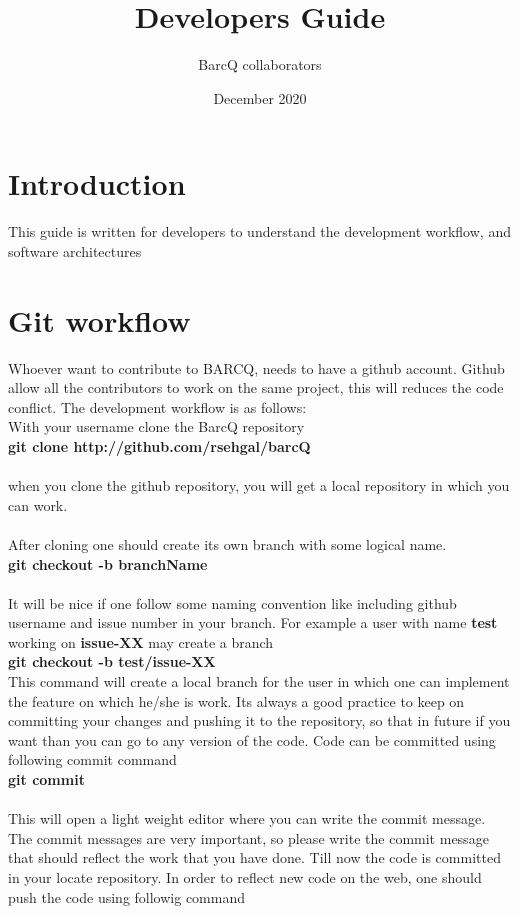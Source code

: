 \documentclass{article}
\title{Developers Guide}
\author{BarcQ collaborators }
\date{December 2020}
\begin{document}
\maketitle

\section{Introduction}
This guide is written for developers to understand the development workflow, and software architectures

\section{Git workflow}
Whoever want to contribute to BARCQ, needs to have a github account. Github allow all the contributors to work on the same project, this will reduces the code conflict. The development workflow is as follows:\\
With your username clone the BarcQ repository \\ 

       \textbf{git clone http://github.com/rsehgal/barcQ}\\ \\
   when you clone the github repository, you will get a local repository in which you can work. \\ \\
   After cloning one should create its own branch with some logical name. \\ 
   
   \textbf{git checkout -b branchName}\\ \\
   It will be nice if one follow some naming convention like including github username and issue number in your branch. For example a user with name \textbf{test} working on \textbf{issue-XX} may create a branch \\  
   
   \textbf{git checkout -b test/issue-XX} \\
   
   This command will create a local branch for the user in which one can implement the feature on which he/she is work. Its always a good practice to keep on committing your changes and pushing it to the repository, so that in future if you want than you can go to any version of the code. Code can be committed using following commit command \\
   
   \textbf{git commit}\\ \\
   This will open a light weight editor where you can write the commit message. The commit messages are very important, so please write the commit message that should reflect the work that you have done. Till now the code is committed in your locate repository. In order to reflect new code on the web, one should push the code using followig command \\
   
\end{document}
